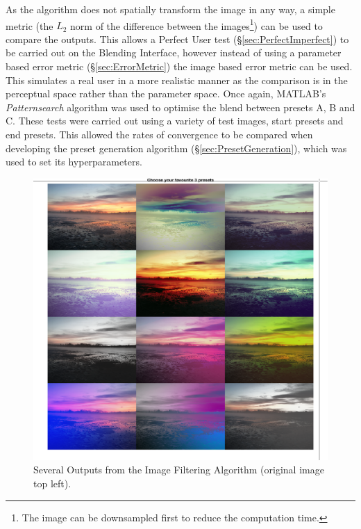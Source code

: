 \documentclass[11pt, oneside]{report}   	%
\begin{document}
As the algorithm does not spatially transform the image in any way, a simple metric (the $L_2$ norm of the difference between the images\footnote{The image can be downsampled first to reduce the computation time.}) can be used to compare the outputs. This allows a Perfect User test (\S \ref{sec:PerfectImperfect}) to be carried out on the Blending Interface, however instead of using a parameter based error metric (\S \ref{sec:ErrorMetric}) the image based error metric can be used. This simulates a real user in a more realistic manner as the comparison is in the perceptual space rather than the parameter space. Once again, MATLAB's \emph{Patternsearch} algorithm was used to optimise the blend between presets A, B and C. These tests were carried out using a variety of test images, start presets and end presets. This allowed the rates of convergence to be compared when developing the preset generation algorithm (\S \ref{sec:PresetGeneration}), which was used to set its hyperparameters.

\begin{figure}[h]
	\hspace{-30pt}
	\includegraphics[trim = {0.5cm, 12.5cm, 2cm, 1cm}, clip, width = 7in]{ImageEditing.png}
	\caption{Several Outputs from the Image Filtering Algorithm (original image top left).}
	\label{fig:ImageFIlteringOutput}
	\vspace{-20pt}
\end{figure}
\end{document}
